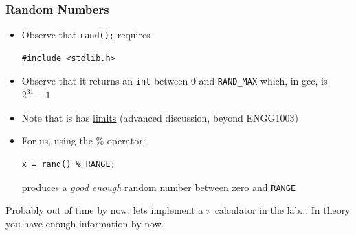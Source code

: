 \documentclass[14pt]{beamer}
\begin{document}
\begin{frame}[fragile]
\frametitle{Random Numbers}
\begin{itemize}
\item Observe that \texttt{rand();} requires 
\begin{lstlisting}[style=CStyle]
#include <stdlib.h>
\end{lstlisting}
\item Observe that it returns an \texttt{int} between 0 and \texttt{RAND\_MAX} which, in gcc, is $2^{31}-1$
\item Note that is has \underline{\href{http://www.azillionmonkeys.com/qed/random.html}{limits}} (advanced discussion, beyond ENGG1003)
\item For us, using the \% operator:
\begin{lstlisting}[style=CStyle]
x = rand() % RANGE;
\end{lstlisting}
produces a \textit{good enough} random number between zero and \texttt{RANGE}
\end{itemize}
\end{frame}

\begin{frame}
Probably out of time by now, lets implement a $\pi$ calculator in the lab... In theory you have enough information by now.
\end{frame}
\end{document}
